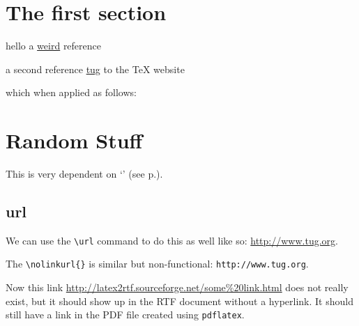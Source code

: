 \documentclass{article}
\newif\iflatextortf
\begin{document}
\newcommand{\myref}[1]{`\nameref{#1}' (see p.\pageref{#1})}

\iflatextortf
\newcommand{\myurl}[1]{\nolinkurl{#1}}
\let\letequalurl=\nolinkurl
\let\leturl\nolinkurl
\else
\let\myurl\url
\let\letequalurl=\url
\let\leturl\url
\fi

\section{The first section}
hello a 
\href{http://www-fourier.ujf-grenoble.fr:80/cgi-bin/zbfr/ZB/math-fr.html?AU=Taylor,+R&format=complete&type=html&maxdocs=10}{weird}
reference

a second reference 
\href{http://www.tug.org/}{tug}
to the \TeX{} website 

which when applied as follows:

\section{Random Stuff}\label{randomlabel}
This is very dependent on \myref{randomlabel}.


\subsection{url}
We can use the \verb#\url# command to do this as
well like so: \url{http://www.tug.org}.  

The \verb#\nolinkurl{}# is similar but non-functional: \nolinkurl{http://www.tug.org}. 

Now this link \myurl{http://latex2rtf.sourceforge.net/some%
exist, but it should show up in the RTF document without a hyperlink.  It should still
have a link in the PDF file created using \texttt{pdflatex}.
\end{document}
